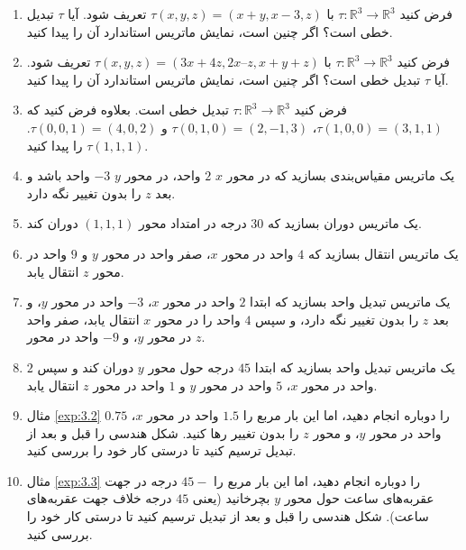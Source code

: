 {
    \Large
    \begin{spacing}{1.5}
        \begin{enumerate}[label=\textbf{\arabic*}.]
            \item {فرض کنید $\tau: \mathbb{R}^3\rightarrow\mathbb{R}^3$ با $\tau(x,y,z)=(x+y,x-3,z)$ تعریف شود.
            آیا $\tau$ تبدیل خطی است؟ اگر چنین است، نمایش ماتریس استاندارد آن را پیدا کنید.}

            \item {فرض کنید $\tau: \mathbb{R}^3\rightarrow\mathbb{R}^3$ با $\tau(x,y,z)=(3x+4z, 2x–z, x+y+z)$ تعریف شود.
            آیا $\tau$ تبدیل خطی است؟ اگر چنین است، نمایش ماتریس استاندارد آن را پیدا کنید.}

            \item {فرض کنید $\tau: \mathbb{R}^3\rightarrow\mathbb{R}^3$ تبدیل خطی است.
            بعلاوه فرض کنید که $\tau(1,0,0)=(3,1,1)$، $\tau(0,1,0)=(2,-1,3)$ و $\tau(0,0,1)=(4,0,2)$. $\tau(1,1,1)$ را پیدا کنید.}

            \item {یک ماتریس مقیاس‌بندی بسازید که در محور $x$ $2$ واحد، در محور $y$ $-3$ واحد باشد و بعد $z$ را بدون تغییر نگه دارد.}

            \item {یک ماتریس دوران بسازید که 30 درجه در امتداد محور $(1,1,1)$ دوران کند.}

            \item {یک ماتریس انتقال بسازید که $4$ واحد در محور $x$، صفر واحد در محور $y$ و $9$ واحد در محور $z$ انتقال یابد.}

            \item {یک ماتریس تبدیل واحد بسازید که ابتدا $2$ واحد در محور $x$، $-3$ واحد در محور $y$، و بعد $z$ را بدون تغییر نگه دارد، و سپس $4$ واحد را در محور $x$ انتقال یابد، صفر واحد در محور $y$، و $-9$ واحد در محور $z$.}

            \item {یک ماتریس تبدیل واحد بسازید که ابتدا $45$ درجه حول محور $y$ دوران کند و سپس $2$ واحد در محور $x$، $5$ واحد در محور $y$ و $1$ واحد در محور $z$ انتقال یابد.}

            \item {مثال \ref{exp:3.2} را دوباره انجام دهید، اما این بار مربع را $1.5$ واحد در محور $x$، $0.75$ واحد در محور $y$، و محور $z$ را بدون تغییر رها کنید.
            شکل هندسی را قبل و بعد از تبدیل ترسیم کنید تا درستی کار خود را بررسی کنید.}

            \item {مثال \ref{exp:3.3} را دوباره انجام دهید، اما این بار مربع را $45-$ درجه در جهت عقربه‌های ساعت حول محور $y$ بچرخانید (یعنی $45$ درجه خلاف جهت عقربه‌های ساعت).
            شکل هندسی را قبل و بعد از تبدیل ترسیم کنید تا درستی کار خود را بررسی کنید.}


\end{enumerate}
\end{spacing}}
